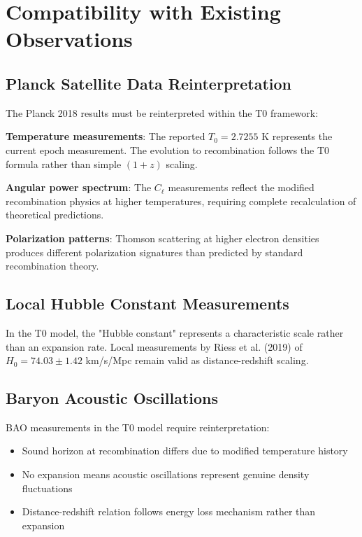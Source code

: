 \documentclass[12pt,a4paper]{article}
\begin{document}
	\section{Compatibility with Existing Observations}
	\label{sec:existing_observations}
	
	\subsection{Planck Satellite Data Reinterpretation}
	\label{subsec:planck_reinterpretation}
	
	The Planck 2018 results must be reinterpreted within the T0 framework:
	
	\textbf{Temperature measurements}: The reported $T_0 = 2.7255$ K represents the current epoch measurement. The evolution to recombination follows the T0 formula rather than simple $(1+z)$ scaling.
	
	\textbf{Angular power spectrum}: The $C_\ell$ measurements reflect the modified recombination physics at higher temperatures, requiring complete recalculation of theoretical predictions.
	
	\textbf{Polarization patterns}: Thomson scattering at higher electron densities produces different polarization signatures than predicted by standard recombination theory.
	
	\subsection{Local Hubble Constant Measurements}
	\label{subsec:local_hubble}
	
	In the T0 model, the "Hubble constant" represents a characteristic scale rather than an expansion rate. Local measurements by Riess et al. (2019) of $H_0 = 74.03 \pm 1.42$ km/s/Mpc remain valid as distance-redshift scaling.
	
	\subsection{Baryon Acoustic Oscillations}
	\label{subsec:bao}
	
	BAO measurements in the T0 model require reinterpretation:
	\begin{itemize}
		\item Sound horizon at recombination differs due to modified temperature history
		\item No expansion means acoustic oscillations represent genuine density fluctuations
		\item Distance-redshift relation follows energy loss mechanism rather than expansion
	\end{itemize}
	
\end{document}
